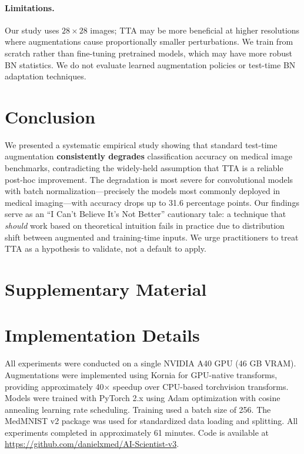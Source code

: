 \documentclass{article}
\theoremstyle{plain}
\theoremstyle{definition}
\theoremstyle{remark}
\begin{document}
\paragraph{Limitations.}
Our study uses $28 \times 28$ images; TTA may be more beneficial at higher resolutions where augmentations cause proportionally smaller perturbations. We train from scratch rather than fine-tuning pretrained models, which may have more robust BN statistics. We do not evaluate learned augmentation policies or test-time BN adaptation techniques.

\section{Conclusion}
\label{sec:conclusion}

We presented a systematic empirical study showing that standard test-time augmentation \textbf{consistently degrades} classification accuracy on medical image benchmarks, contradicting the widely-held assumption that TTA is a reliable post-hoc improvement. The degradation is most severe for convolutional models with batch normalization---precisely the models most commonly deployed in medical imaging---with accuracy drops up to 31.6 percentage points. Our findings serve as an ``I Can't Believe It's Not Better'' cautionary tale: a technique that \emph{should} work based on theoretical intuition fails in practice due to distribution shift between augmented and training-time inputs. We urge practitioners to treat TTA as a hypothesis to validate, not a default to apply.




\appendix
\section*{\LARGE Supplementary Material}

\section{Implementation Details}
\label{sec:appendix_impl}

All experiments were conducted on a single NVIDIA A40 GPU (46 GB VRAM). Augmentations were implemented using Kornia for GPU-native transforms, providing approximately 40$\times$ speedup over CPU-based torchvision transforms. Models were trained with PyTorch 2.x using Adam optimization with cosine annealing learning rate scheduling. Training used a batch size of 256. The MedMNIST v2 package was used for standardized data loading and splitting. All experiments completed in approximately 61 minutes. Code is available at \url{https://github.com/danielxmed/AI-Scientist-v3}.
\end{document}
